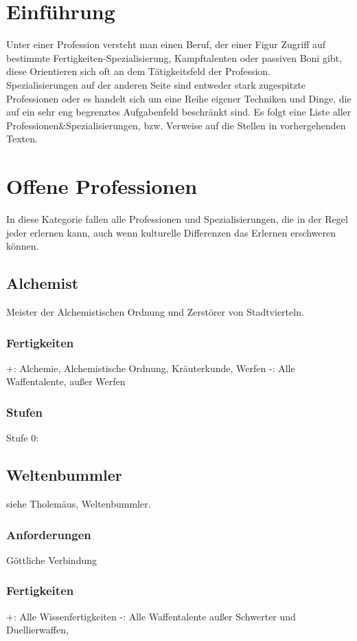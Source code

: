\documentclass[a4paper,12pt,oneside]{book}
\begin{document}
\chapter{Einführung}
Unter einer Profession versteht man einen Beruf, der einer Figur Zugriff auf bestimmte Fertigkeiten-Spezialisierung, Kampftalenten oder passiven Boni gibt, diese Orientieren sich oft an dem Tätigkeitsfeld der Profession.
\\Spezialisierungen auf der anderen Seite sind entweder stark zugespitzte Professionen oder es handelt sich um eine Reihe eigener Techniken und Dinge, die auf ein sehr eng begrenztes Aufgabenfeld beschränkt sind.
Es folgt eine Liste aller Professionen\&Spezialisierungen, bzw. Verweise auf die Stellen in vorhergehenden Texten.
\chapter{Offene Professionen}
In diese Kategorie fallen alle Professionen und Spezialisierungen, die in der Regel jeder erlernen kann, auch wenn kulturelle Differenzen das Erlernen erschweren können.
\section{Alchemist}
Meister der Alchemistischen Ordnung und Zerstörer von Stadtvierteln.
\subsection{Fertigkeiten}
+: Alchemie, Alchemistische Ordnung, Kräuterkunde, Werfen
-: Alle Waffentalente, außer Werfen
\subsection{Stufen}
\begin{description}
\item[Stufe 0:]
\end{description}

\section{Weltenbummler}
siehe Tholemäus, Weltenbummler.
\subsection{Anforderungen}
Göttliche Verbindung
\subsection{Fertigkeiten}
+: Alle Wissenfertigkeiten
-: Alle Waffentalente außer Schwerter und Duellierwaffen, 
\end{document}
